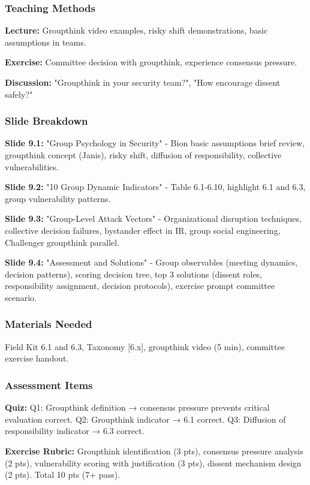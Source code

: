 \documentclass[11pt,a4paper]{article}
\begin{document}
\subsubsection{Teaching Methods}
\textbf{Lecture:} Groupthink video examples, risky shift demonstrations, basic assumptions in teams.

\textbf{Exercise:} Committee decision with groupthink, experience consensus pressure.

\textbf{Discussion:} "Groupthink in your security team?", "How encourage dissent safely?"

\subsubsection{Slide Breakdown}
\textbf{Slide 9.1:} "Group Psychology in Security" - Bion basic assumptions brief review, groupthink concept (Janis), risky shift, diffusion of responsibility, collective vulnerabilities.

\textbf{Slide 9.2:} "10 Group Dynamic Indicators" - Table 6.1-6.10, highlight 6.1 and 6.3, group vulnerability patterns.

\textbf{Slide 9.3:} "Group-Level Attack Vectors" - Organizational disruption techniques, collective decision failures, bystander effect in IR, group social engineering, Challenger groupthink parallel.

\textbf{Slide 9.4:} "Assessment and Solutions" - Group observables (meeting dynamics, decision patterns), scoring decision tree, top 3 solutions (dissent roles, responsibility assignment, decision protocols), exercise prompt committee scenario.

\subsubsection{Materials Needed}
Field Kit 6.1 and 6.3, Taxonomy [6.x], groupthink video (5 min), committee exercise handout.

\subsubsection{Assessment Items}
\textbf{Quiz:} Q1: Groupthink definition → consensus pressure prevents critical evaluation correct. Q2: Groupthink indicator → 6.1 correct. Q3: Diffusion of responsibility indicator → 6.3 correct.

\textbf{Exercise Rubric:} Groupthink identification (3 pts), consensus pressure analysis (2 pts), vulnerability scoring with justification (3 pts), dissent mechanism design (2 pts). Total 10 pts (7+ pass).
\end{document}
